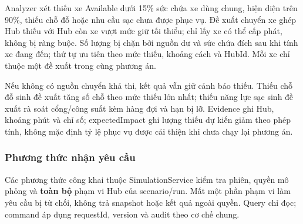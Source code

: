 Analyzer xét thiếu xe Available dưới 15\% sức chứa xe dùng chung, hiện diện trên 90\%, thiếu chỗ đỗ hoặc nhu cầu sạc chưa được phục vụ. Đề xuất chuyển xe ghép Hub thiếu với Hub còn xe vượt mức giữ tối thiểu; chỉ lấy xe có thể cấp phát, không bị ràng buộc. Số lượng bị chặn bởi nguồn dư và sức chứa đích sau khi tính xe đang đến; thứ tự ưu tiên theo mức thiếu, khoảng cách và HubId. Mỗi xe chỉ thuộc một đề xuất trong cùng phương án.

Nếu không có nguồn chuyển khả thi, kết quả vẫn giữ cảnh báo thiếu. Thiếu chỗ đỗ sinh đề xuất tăng số chỗ theo mức thiếu lớn nhất; thiếu năng lực sạc sinh đề xuất rà soát cổng/công suất kèm hàng đợi và hạn bị lỡ. Evidence ghi Hub, khoảng phút và chỉ số; expectedImpact ghi lượng thiếu dự kiến giảm theo phép tính, không mặc định tỷ lệ phục vụ được cải thiện khi chưa chạy lại phương án.

\subsubsection{Phương thức nhận yêu cầu}
Các phương thức công khai thuộc SimulationService kiểm tra phiên, quyền mô phỏng và \textbf{toàn bộ} phạm vi Hub của scenario/run. Mất một phần phạm vi làm yêu cầu bị từ chối, không trả snapshot hoặc kết quả ngoài quyền. Query chỉ đọc; command áp dụng requestId, version và audit theo cơ chế chung.

